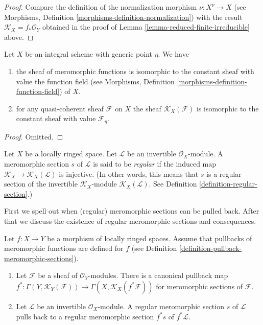 \begin{proof}
Compare the definition of the normalization morphism
$\nu : X^\nu \to X$ (see
Morphisms, Definition \ref{morphisms-definition-normalization})
with the result $\mathcal{K}_X = f_*\mathcal{O}_Y$ obtained
in the proof of Lemma \ref{lemma-reduced-finite-irreducible} above.
\end{proof}

\begin{lemma}
\label{lemma-meromorphic-functions-integral-scheme}
Let $X$ be an integral scheme with generic point $\eta$. We have
\begin{enumerate}
\item the sheaf of meromorphic functions is
isomorphic to the constant sheaf with value the
function field (see
Morphisms, Definition \ref{morphisms-definition-function-field})
of $X$.
\item for any quasi-coherent sheaf $\mathcal{F}$ on $X$ the
sheaf $\mathcal{K}_X(\mathcal{F})$ is isomorphic to the
constant sheaf with value $\mathcal{F}_\eta$.
\end{enumerate}
\end{lemma}

\begin{proof}
Omitted.
\end{proof}

\begin{definition}
\label{definition-regular-meromorphic-section}
Let $X$ be a locally ringed space.
Let $\mathcal{L}$ be an invertible $\mathcal{O}_X$-module.
A meromorphic section $s$ of $\mathcal{L}$ is said to be {\it regular}
if the induced map
$\mathcal{K}_X \to \mathcal{K}_X(\mathcal{L})$
is injective. (In other words, this means that $s$ is a regular
section of the invertible $\mathcal{K}_X$-module
$\mathcal{K}_X(\mathcal{L})$. See
Definition \ref{definition-regular-section}.)
\end{definition}

\noindent
First we spell out when (regular) meromorphic sections can be pulled back.
After that we discuss the existence of regular meromorphic sections
and consequences.

\begin{lemma}
\label{lemma-meromorphic-sections-pullback}
Let $f : X \to Y$ be a morphism of locally ringed spaces.
Assume that pullbacks of meromorphic functions are defined
for $f$ (see
Definition \ref{definition-pullback-meromorphic-sections}).
\begin{enumerate}
\item Let $\mathcal{F}$ be a sheaf of $\mathcal{O}_Y$-modules.
There is a canonical pullback map
$f^* : \Gamma(Y, \mathcal{K}_Y(\mathcal{F})) \to
\Gamma(X, \mathcal{K}_X(f^*\mathcal{F}))$
for meromorphic sections of $\mathcal{F}$.
\item Let $\mathcal{L}$ be an invertible $\mathcal{O}_X$-module.
A regular meromorphic section $s$ of $\mathcal{L}$ pulls back
to a regular meromorphic section $f^*s$ of $f^*\mathcal{L}$.
\end{enumerate}
\end{lemma}

